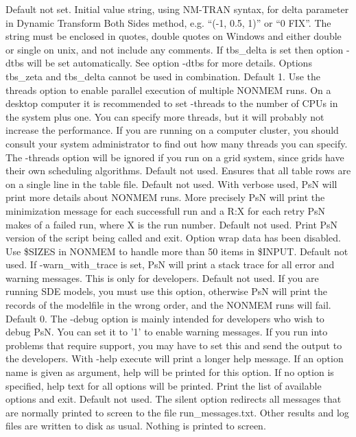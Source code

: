 \begin{optionlist}
\nextopt
{}
Default not set. Initial value string, using NM-TRAN syntax, for delta parameter in Dynamic Transform Both Sides method, e.g. ``(-1, 0.5, 1)'' or ``0 FIX''. 
The string must be enclosed in quotes, double quotes on Windows and either double or single on unix, and not include any comments.
If tbs\_delta is set then option -dtbs will be set automatically. See option -dtbs for more details. Options tbs\_zeta and tbs\_delta cannot be used in combination.  
\nextopt
{}
Default 1. Use the threads option to enable parallel execution of multiple NONMEM runs. On a desktop computer it is recommended to set -threads to the number of CPUs in the system plus one. You can specify more threads, but it will probably not increase the performance. If you are running on a computer cluster, you should consult your system administrator to find out how many threads you can specify. The -threads option will be ignored if you run on a grid system, since grids have their own scheduling algorithms. 
\nextopt
{}
Default not used. Ensures that all table rows are on a single line in the table file. 
\nextopt
{}
Default not used. With verbose used, PsN will print more details about NONMEM runs. More precisely PsN will print the minimization message for each successfull run and a R:X for each retry PsN makes of a failed run, where X is the run number. 
\nextopt
{}
Default not used. Print PsN version of the script being called and exit. 
\nextopt
{}
Option wrap data has been disabled. Use \$SIZES in NONMEM to handle more than 50 items in \$INPUT. 
\nextopt
{}
Default not used. If -warn\_with\_trace is set, PsN will print a stack trace for all error and warning messages. This is only for developers. 
\nextopt
{}
Default not used. If you are running SDE models, you must use this option, otherwise PsN will print the records of the modelfile in the wrong order, and the NONMEM runs will fail. 
\nextopt
{}
Default 0. The -debug option is mainly intended for developers who wish to debug PsN. You can set it to '1' to enable warning messages. If you run into problems that require support, you may have to set this and send the output to the developers. 
\nextopt
{}
With -help execute will print a longer help message. If an option name is given as argument, help will be printed for this option. If no option is specified, help text for all options will be printed. 
\nextopt
{}
Print the list of available options and exit. 
\nextopt
{}
Default not used. The silent option redirects all messages that are normally printed to screen to the file run\_messages.txt. Other results and log files are written to disk as usual. Nothing is printed to screen. 
\nextopt
\end{optionlist}


